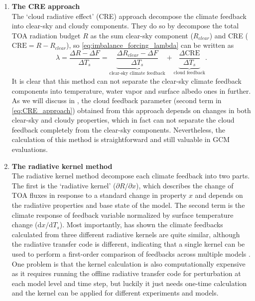 \begin{enumerate}[label={(\arabic*)}]
    \item \textbf{The CRE approach}\\
    The `cloud radiative effect' (CRE) approach \citep[or CRF in][]{Cess1990intercomparison, Cess1996cloud} decompose the climate feedback into clear-sky and cloudy components. They do so by decompose the total TOA radiation budget $R$ as the sum clear-sky component ($R_{clear}$) and CRE ($\mathrm{CRE}=R-R_{clear}$), so \eqref{eq:imbalance_forcing_lambda} can be written as
    \begin{equation}
        \lambda = \frac{\Delta R - \Delta F}{\Delta T_s} = \underbrace{\frac{\Delta R_{clear} - \Delta F}{\Delta T_s}}_{\text{clear-sky climate feedback}} + \underbrace{\frac{\Delta\mathrm{CRE}}{\Delta T_s}}_{\text{cloud feedback}}.
        \label{eq:CRE_approach}
    \end{equation}
    It is clear that this method can not separate the clear-sky climate feedback components into temperature, water vapor and surface albedo ones in further. As we will discuss in , the cloud feedback parameter (second term in \eqref{eq:CRE_approach}) obtained from this approach depends on changes in both clear-sky and cloudy properties, which in fact can not separate the cloud feedback completely from the clear-sky components. Nevertheless, the calculation of this method is straightforward and still valuable in GCM evaluations.
    
    \item \textbf{The radiative kernel method}\\
    The radiative kernel method \citep[e.g.,][]{Soden2006,Soden2008,Shell2008} decompose each climate feedback into two parts. The first is the `radiative kernel' ($\partial R/\partial x$), which describes the change of TOA fluxes in response to a standard change in property $x$ and depends on the radiative properties and base state of the model. The second term is the climate response of feedback variable normalized by surface temperature change ($\mathrm{d} x/\mathrm{d} T_s$). Most importantly, \cite{Soden2008} has shown the climate feedbacks calculated from three different radiative kernels are quite similar, although the radiative transfer code is different, indicating that a single kernel can be used to perform a first-order comparison of feedbacks across multiple models \citep{Shell2008}. One problem is that the kernel calculation is also computationally expensive as it requires running the offline radiative transfer code for perturbation at each model level and time step, but luckily it just needs one-time calculation and the kernel can be applied for different experiments and models. %
\end{enumerate}   
    

